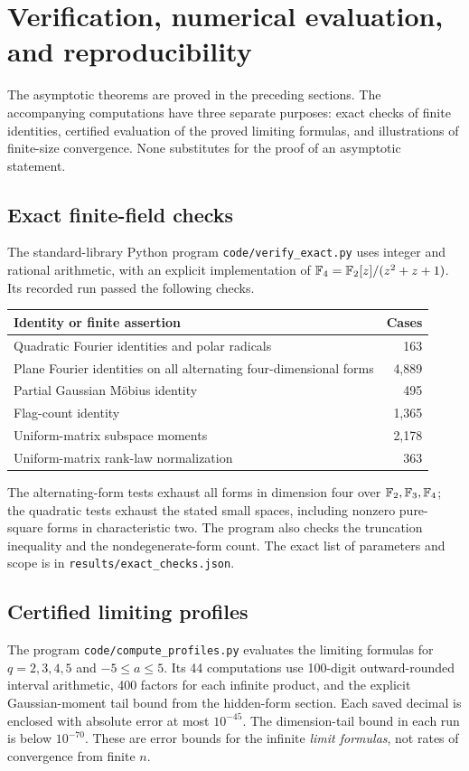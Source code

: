 \section{Verification, numerical evaluation, and reproducibility}
\label{sec:verification}

The asymptotic theorems are proved in the preceding sections. The
accompanying computations have three separate purposes: exact checks of
finite identities, certified evaluation of the proved limiting formulas,
and illustrations of finite-size convergence. None substitutes for the
proof of an asymptotic statement.

\subsection{Exact finite-field checks}
The standard-library Python program \texttt{code/verify\_exact.py} uses
integer and rational arithmetic, with an explicit implementation of
$\mathbb F_4=\mathbb F_2[z]/(z^2+z+1)$. Its recorded run passed the following checks.
\begin{center}
\begin{tabular}{@{}lr@{}}
\toprule
Identity or finite assertion & Cases\\
\midrule
Quadratic Fourier identities and polar radicals & 163\\
Plane Fourier identities on all alternating four-dimensional forms & 4,889\\
Partial Gaussian M\"obius identity & 495\\
Flag-count identity & 1,365\\
Uniform-matrix subspace moments & 2,178\\
Uniform-matrix rank-law normalization & 363\\
\bottomrule
\end{tabular}
\end{center}
The alternating-form tests exhaust all forms in dimension four over
$\mathbb F_2,\mathbb F_3,\mathbb F_4$; the quadratic tests exhaust the stated small spaces,
including nonzero pure-square forms in characteristic two. The program
also checks the truncation inequality and the nondegenerate-form count.
The exact list of parameters and scope is in
\texttt{results/exact\_checks.json}.

\subsection{Certified limiting profiles}
The program \texttt{code/compute\_profiles.py} evaluates the limiting
formulas for $q=2,3,4,5$ and $-5\le a\le5$.
Its 44 computations use 100-digit outward-rounded interval arithmetic,
400 factors for each infinite product, and the explicit Gaussian-moment
tail bound from the hidden-form section. Each saved decimal is enclosed
with absolute error at most $10^{-45}$. The dimension-tail bound in
each run is below $10^{-70}$. These are error bounds for the infinite
\emph{limit formulas}, not rates of convergence from finite $n$.

